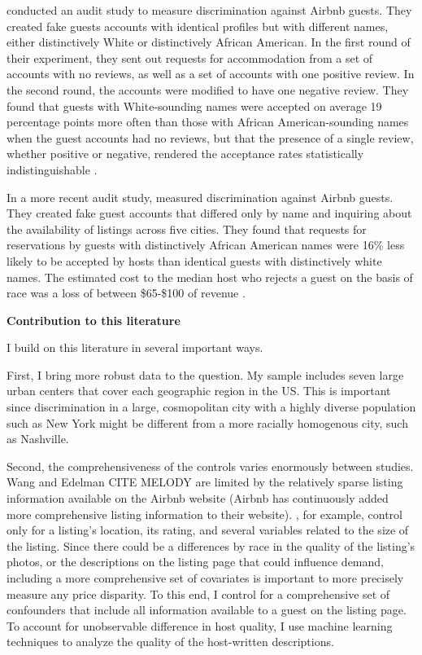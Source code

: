 \cite{cui} conducted an audit study to measure discrimination against Airbnb guests. They created fake guests accounts with identical profiles but with different names, either distinctively White or distinctively African American. In the first round of their experiment, they sent out requests for accommodation from a set of accounts with no reviews, as well as a set of accounts with one positive review. In the second round, the accounts were modified to have one negative review. They found that guests with White-sounding names were accepted on average 19 percentage points more often than those with African American-sounding names when the guest accounts had no reviews, but that the presence of a single review, whether positive or negative, rendered the acceptance rates statistically indistinguishable \cite{cui}.

In a more recent audit study, \cite{edelman2} measured discrimination against Airbnb guests. They created fake guest accounts that differed only by name and inquiring about the availability of listings across five cities. They found that requests for reservations by guests with distinctively African American names were 16\% less likely to be accepted by hosts than identical guests with distinctively white names. The estimated cost to the median host who rejects a guest on the basis of race was a loss of between \$65-\$100 of revenue \cite{edelman2}.

\vspace{5mm}
\textbf{Contribution to this literature}

I build on this literature in several important ways. 

First, I bring more robust data to the question. My sample includes seven large urban centers that cover each geographic region in the US. This is important since discrimination in a large, cosmopolitan city with a highly diverse population such as New York might be different from a more racially homogenous city, such as Nashville. 

Second, the comprehensiveness of the controls varies enormously between studies. Wang and Edelman CITE MELODY are limited by the relatively sparse listing information available on the Airbnb website (Airbnb has continuously added more comprehensive listing information to their website). \cite{edelman}, for example, control only for a listing's location, its rating, and several variables related to the size of the listing. Since there could be a differences by race in the quality of the listing’s photos, or the descriptions on the listing page that could influence demand, including a more comprehensive set of covariates is important to more precisely measure any price disparity. To this end, I control for a comprehensive set of confounders that include all information available to a guest on the listing page. To account for unobservable difference in host quality, I use machine learning techniques to analyze the quality of the host-written descriptions.

